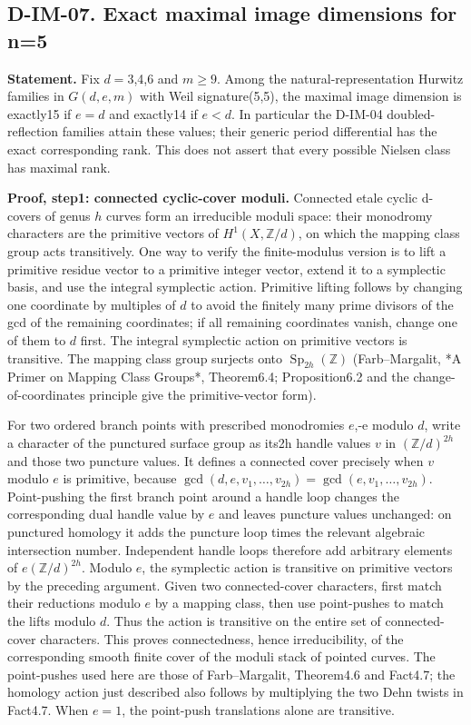 \subsection{D-IM-07. Exact maximal image dimensions for n=5}
\label{D-IM-07}

\textbf{Statement.} Fix \(d= 3\),4,6 and \(m\geq 9\). Among the natural-representation Hurwitz families in \(G(d,e,m)\) with Weil signature(5,5), the maximal image dimension is exactly15 if \(e= d\) and exactly14 if \(e< d\). In particular the D-IM-04 doubled-reflection families attain these values; their generic period differential has the exact corresponding rank. This does not assert that every possible Nielsen class has maximal rank.

\textbf{Proof, step1: connected cyclic-cover moduli.} Connected etale cyclic d-covers of genus \(h\) curves form an irreducible moduli space: their monodromy characters are the primitive vectors of \(H^1(X,\mathbb Z/d)\), on which the mapping class group acts transitively. One way to verify the finite-modulus version is to lift a primitive residue vector to a primitive integer vector, extend it to a symplectic basis, and use the integral symplectic action. Primitive lifting follows by changing one coordinate by multiples of \(d\) to avoid the finitely many prime divisors of the gcd of the remaining coordinates; if all remaining coordinates vanish, change one of them to \(d\) first. The integral symplectic action on primitive vectors is transitive. The mapping class group surjects onto \(\operatorname{Sp}_{2h}(\mathbb Z)\) (Farb--Margalit, *A Primer on Mapping Class Groups*, Theorem6.4; Proposition6.2 and the change-of-coordinates principle give the primitive-vector form). \cite{IM-FarbMargalit}

For two ordered branch points with prescribed monodromies \(e\),-e modulo \(d\), write a character of the punctured surface group as its2h handle values \(v\) in \((\mathbb Z/d)^{2h}\) and those two puncture values. It defines a connected cover precisely when \(v\) modulo \(e\) is primitive, because \(\gcd(d,e,v_1,\ldots,v_{2h})=\gcd(e,v_1,\ldots,v_{2h})\). Point-pushing the first branch point around a handle loop changes the corresponding dual handle value by \(e\) and leaves puncture values unchanged: on punctured homology it adds the puncture loop times the relevant algebraic intersection number. Independent handle loops therefore add arbitrary elements of \(e(\mathbb Z/d)^{2h}\). Modulo \(e\), the symplectic action is transitive on primitive vectors by the preceding argument. Given two connected-cover characters, first match their reductions modulo \(e\) by a mapping class, then use point-pushes to match the lifts modulo \(d\). Thus the action is transitive on the entire set of connected-cover characters. This proves connectedness, hence irreducibility, of the corresponding smooth finite cover of the moduli stack of pointed curves. The point-pushes used here are those of Farb--Margalit, Theorem4.6 and Fact4.7; the homology action just described also follows by multiplying the two Dehn twists in Fact4.7. When \(e= 1\), the point-push translations alone are transitive. \cite{IM-FarbMargalit}


